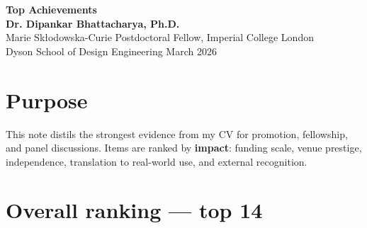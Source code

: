 \documentclass[11pt,a4paper]{article}
\begin{document}
\begin{center}
  {\Huge\bfseries\sffamily\color{accent} Top Achievements}\\[0.35em]
  {\large\bfseries Dr. Dipankar Bhattacharya, Ph.D.}\\[0.2em]
  {\normalsize Marie Sk\l{}odowska-Curie Postdoctoral Fellow, Imperial College London}\\[0.15em]
  {\small Dyson School of Design Engineering \textbar{} March 2026}
\end{center}

\vspace{0.4em}

\section*{Purpose}
This note distils the strongest evidence from my CV for promotion, fellowship, and panel discussions.
Items are ranked by \textbf{impact}: funding scale, venue prestige, independence, translation to real-world use, and external recognition.

\section*{Overall ranking --- top 14}
\end{document}
